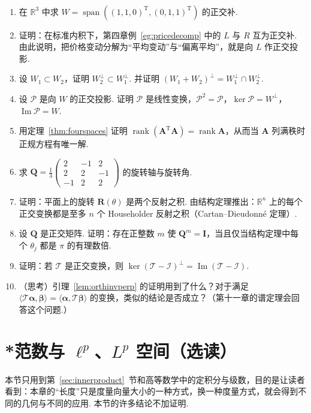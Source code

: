 \documentclass[lang=cn,10.5pt,scheme=chinese,toc=twocol,section,chinesefont=nofont,
twoside,citestyle=gb7714-2015,bibstyle=gb7714-2015]{elegantbook}
\newcommand{\vv}[1]{\boldsymbol{#1}}
\newcommand{\trans}{\mathrm{T}}             %
\numberwithin{equation}{section}   %
\newcommand{\spn}{\operatorname{span}}      %
\newcommand{\rk}{\operatorname{rank}}       %
\newcommand{\imm}{\operatorname{Im}}        %
\newcommand*{\lnlabel}[1]{{\sffamily\bfseries\color{black}#1}}
\renewenvironment{exercise}[1][]{%
	\refstepcounter{exer}%
	\par\noindent\makebox[-3pt][r]{\scriptsize\color{black}\HandPencilLeft\quad}%
	\lnlabel{\exercisename\ \theexer\ifblank{#1}{}{\ #1}}\ \rmfamily}{%
	\par\ignorespacesafterend}
\begin{document}
\begin{exercise}
  \begin{enumerate}
    \item 在 $\mathbb{R}^3$ 中求 $W=\spn((1,1,0)^\trans,(0,1,1)^\trans)$ 的正交补.
    \item 证明：在标准内积下，第四章例~\ref{eg:pricedecomp} 中的 $L$ 与 $R$ 互为正交补. 由此说明，把价格变动分解为“平均变动”与“偏离平均”，就是向 $L$ 作正交投影.
    \item 设 $W_1\subset W_2$，证明 $W_2^\perp\subset W_1^\perp$. 并证明 $(W_1+W_2)^\perp=W_1^\perp\cap W_2^\perp$.
    \item 设 $\mathscr P$ 是向 $W$ 的正交投影. 证明 $\mathscr P$ 是线性变换，$\mathscr P^2=\mathscr P$，$\ker\mathscr P=W^\perp$，$\imm\mathscr P=W$.
    \item\label{exo:ortho-rank} 用定理~\ref{thm:fourspaces} 证明 $\rk(\vv A^\trans\vv A)=\rk\vv A$，从而当 $\vv A$ 列满秩时正规方程有唯一解.
    \item 求 $\vv Q=\frac13
            \begin{pmatrix}
              2 & -1 & 2 \\2&2&-1\\-1&2&2
            \end{pmatrix}
          $ 的旋转轴与旋转角.
    \item 证明：平面上的旋转 $\vv R(\theta)$ 是两个反射之积. 由结构定理推出：$\mathbb{R}^n$ 上的每个正交变换都是至多 $n$ 个 Householder 反射之积（Cartan–Dieudonné 定理）.
    \item 设 $\vv Q$ 是正交矩阵. 证明：存在正整数 $m$ 使 $\vv Q^m=\vv I$，当且仅当结构定理中每个 $\theta_j$ 都是 $\pi$ 的有理数倍.
    \item 证明：若 $\mathscr T$ 是正交变换，则 $\ker(\mathscr T-\mathscr I)^\perp=\imm(\mathscr T-\mathscr I)$.
    \item （思考）引理~\ref{lem:orthinvperp} 的证明用到了什么？对于满足 $\langle\mathscr T\vv\alpha,\vv\beta\rangle=\langle\vv\alpha,\mathscr T\vv\beta\rangle$ 的变换，类似的结论是否成立？（第十一章的谱定理会回答这个问题.）
  \end{enumerate}
\end{exercise}
\section{*范数与 \texorpdfstring{$\ell^p$}{lp}、\texorpdfstring{$L^p$}{Lp} 空间（选读）}\label{sec:lp}

本节只用到第~\ref{sec:innerproduct}~节和高等数学中的定积分与级数，目的是让读者看到：本章的“长度”只是度量向量大小的一种方式，换一种度量方式，就会得到不同的几何与不同的应用. 本节的许多结论不加证明.
\end{document}
